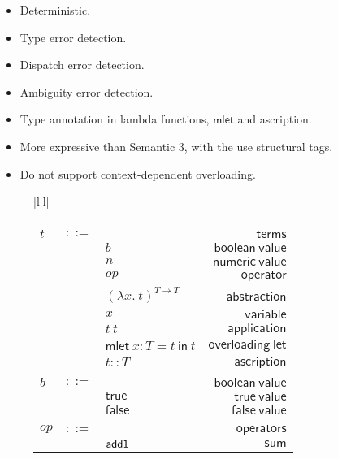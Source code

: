 \documentclass[preprint,authoryear,sort&compress,9pt,nocopyrightspace]{article}
\newcommand{\ascrip}[1]{#1::T}
\newcommand{\oletD}{\mathsf{mlet} \ x : T = t \ \mathsf{in}  \ t}
\newcommand{\app}[2]{#1 \ #2}
\newcommand{\absST}[2]{(\lambda #1. \ #2)^{T \to T}}
\newcommand{\negacion}[1]{\mathsf{not} \ #1}
\newcommand{\suma}[1]{\mathsf{add1} \ #1}
\newcommand{\truet}{\mathsf{true}}
\newcommand{\falset}{\mathsf{false}}
\begin{document}
\begin{itemize}
\item Deterministic.
\item Type error detection.
\item Dispatch error detection.
\item Ambiguity error detection.
\item Type annotation in lambda functions, $\mathsf{mlet}$ and ascription.
\item More expressive than Semantic 3, with the use structural tags.
\item Do not support context-dependent overloading.
\end{itemize}

\setlength{\topmargin}{-25mm}
\setlength{\textheight}{230mm}
\begin{figure}
\begin{small}
\begin{center}
\hspace*{-2cm}
\begin{tabular}{|l|l|}
\hline
\begin{tabular}{l c l r}
&&&\\
$t$&$::=$&&$\mathsf {terms}$\\
&&$b$&$\mathsf {boolean \ value}$\\
&&$n$&$\mathsf {numeric \ value}$\\
&&$op$&$\mathsf{operator}$\\
&&$\absST {x}{t}$&\ $\mathsf {abstraction}$\\
&&$x$&$\mathsf {variable}$\\
&&$\app {t}{t}$&$\mathsf {application}$\\
&&$\oletD$&$\mathsf {overloading \ let}$\\
&&$\ascrip {t}$&$\mathsf {ascription}$\\
&&&\\
$b$&$::=$&&$\mathsf {boolean \ value}$\\
&&$\truet$&$\mathsf {true \ value}$\\
&&$\falset$&$\mathsf {false \ value}$\\
&&&\\
$op$&$::=$&&$\mathsf {operators}$\\
&&$\suma$&$\mathsf {sum}$\\

\end{tabular}
\end{tabular}
\end{center}
\end{small}
\end{figure}
\end{document}
